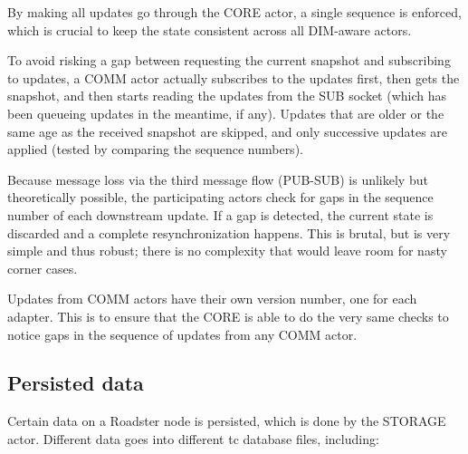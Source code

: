 By making all updates go through the CORE actor, a single sequence is enforced,
which is crucial to keep the state consistent across all DIM-aware actors.

To avoid risking a gap between requesting the current snapshot and subscribing
to updates, a COMM actor actually subscribes to the updates first, then gets the
snapshot, and then starts reading the updates from the SUB socket (which has been
queueing updates in the meantime, if any). Updates that are older or the same
age as the received snapshot are skipped, and only successive updates are
applied (tested by comparing the sequence numbers).

Because message loss via the third message flow (PUB-SUB) is unlikely but
theoretically possible, the participating actors check for gaps in the sequence number of
each downstream update. If a gap is detected, the current state is discarded and a
complete resynchronization happens. This is brutal, but is very simple and thus
robust; there is no complexity that would leave room for nasty corner cases.

Updates from COMM actors have their own version number, one for each adapter.
This is to ensure that the CORE is able to do the very same checks to notice
gaps in the sequence of updates from any COMM actor.



\subsection{Persisted data}\label{sec:scope:persisted_data}
Certain data on a Roadster node is persisted, which is done by the STORAGE
actor. Different data goes into different \gls{tc} database files, including:

